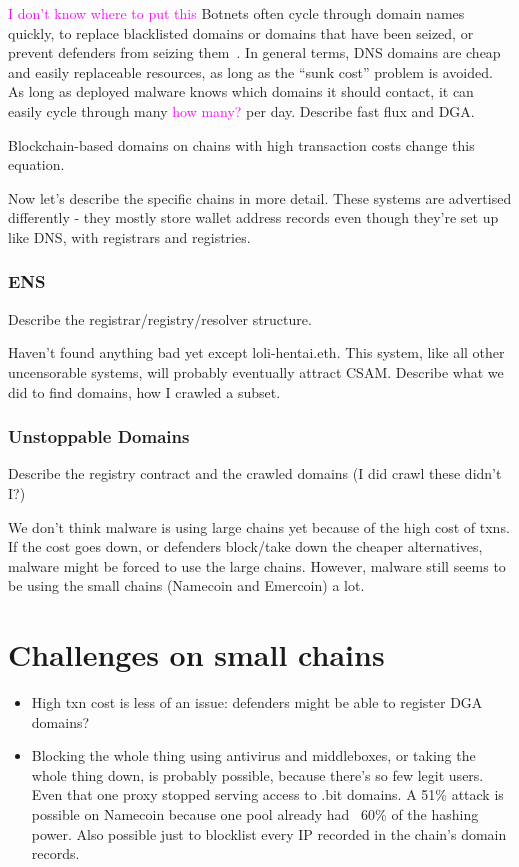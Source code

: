 \documentclass[10pt,sigconf,letterpaper]{acmart}
\newcommand{\randall}{\ding{110}\ding{43}\textcolor{magenta}}
\newcommand{\randall}{}
\begin{document}
\randall{I don't know where to put this} Botnets often cycle through domain names quickly, to 
replace blacklisted domains or domains that have been seized, or prevent defenders from seizing 
them~\cite{nadji_beheading_2013}. In general terms, DNS domains are cheap and easily replaceable 
resources, as long as 
the ``sunk cost'' problem is avoided. As long as deployed malware knows which domains it should 
contact, it can easily cycle through many \randall{how many?} per day. Describe fast flux and DGA.

Blockchain-based domains on chains with high transaction costs change this equation.


Now let's describe the specific chains in more detail. These 
systems are advertised differently - they mostly store 
wallet address records even though they're set up like DNS, 
with registrars and registries. 

\subsubsection{ENS}

Describe the registrar/registry/resolver structure.

Haven't found anything bad yet except loli-hentai.eth. This 
system, like all other uncensorable systems, will probably 
eventually attract CSAM. Describe what we did to find 
domains, how I crawled a subset.

\subsubsection{Unstoppable Domains}

Describe the registry contract and the crawled domains (I did 
crawl these didn't I?)

We don't think malware is using large chains yet because of 
the high cost of txns. If the cost goes down, or defenders 
block/take down the cheaper alternatives, malware might be 
forced to use the large chains. However, malware still seems 
to be using the small chains (Namecoin and Emercoin) a lot.

\section{Challenges on small chains}
\begin{itemize}
	\item High txn cost is less of an issue: defenders might 
	be able to register DGA domains? 
	\item Blocking the whole thing using antivirus and 
	middleboxes, or taking the whole thing down, is probably 
	possible, because there's so few legit users. Even that 
	one proxy stopped serving access to .bit domains. A 51\% 
	attack is possible on Namecoin because one pool already 
	had ~60\% of the hashing power. Also possible just to 
	blocklist every IP recorded in the chain's domain records.
\end{itemize}
\end{document}
